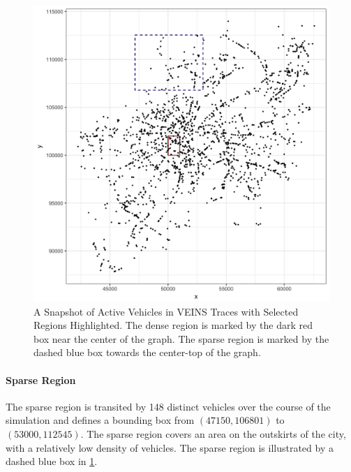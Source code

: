 \documentclass{thesis}
\begin{document}
    \begin{figure}
        \centering
        \includegraphics[scale=.2]{binImages/cars.png}
        \caption{A Snapshot of Active Vehicles in VEINS Traces with Selected Regions Highlighted.
                The dense region is marked by the dark red box near the center of the graph. The
                sparse region is marked by the dashed blue box towards the center-top of the graph.}
        \label{fig:regions}
    \end{figure}
    \paragraph{Sparse Region}
        The sparse region is transited by 148 distinct vehicles over the course of the simulation and defines a bounding
        box from $(47150, 106801)$ to $(53000, 112545)$. The sparse region covers an area on the outskirts of the city,
        with a relatively low density of vehicles. The sparse region is illustrated by a dashed blue box in \ref{fig:regions}.
\end{document}
